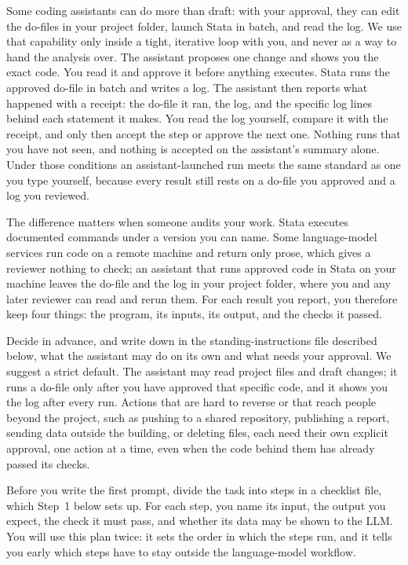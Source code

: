 Some coding assistants can do more than draft: with your approval, they can edit the do-files in your project folder, launch Stata in batch, and read the log. We use that capability only inside a tight, iterative loop with you, and never as a way to hand the analysis over. The assistant proposes one change and shows you the exact code. You read it and approve it before anything executes. Stata runs the approved do-file in batch and writes a log. The assistant then reports what happened with a receipt: the do-file it ran, the log, and the specific log lines behind each statement it makes. You read the log yourself, compare it with the receipt, and only then accept the step or approve the next one. Nothing runs that you have not seen, and nothing is accepted on the assistant's summary alone. Under those conditions an assistant-launched run meets the same standard as one you type yourself, because every result still rests on a do-file you approved and a log you reviewed.

The difference matters when someone audits your work. Stata executes documented commands under a version you can name. Some language-model services run code on a remote machine and return only prose, which gives a reviewer nothing to check; an assistant that runs approved code in Stata on your machine leaves the do-file and the log in your project folder, where you and any later reviewer can read and rerun them. For each result you report, you therefore keep four things: the program, its inputs, its output, and the checks it passed.

Decide in advance, and write down in the standing-instructions file described below, what the assistant may do on its own and what needs your approval. We suggest a strict default. The assistant may read project files and draft changes; it runs a do-file only after you have approved that specific code, and it shows you the log after every run. Actions that are hard to reverse or that reach people beyond the project, such as pushing to a shared repository, publishing a report, sending data outside the building, or deleting files, each need their own explicit approval, one action at a time, even when the code behind them has already passed its checks.

Before you write the first prompt, divide the task into steps in a checklist file, which Step~1 below sets up. For each step, you name its input, the output you expect, the check it must pass, and whether its data may be shown to the LLM. You will use this plan twice: it sets the order in which the steps run, and it tells you early which steps have to stay outside the language-model workflow.

